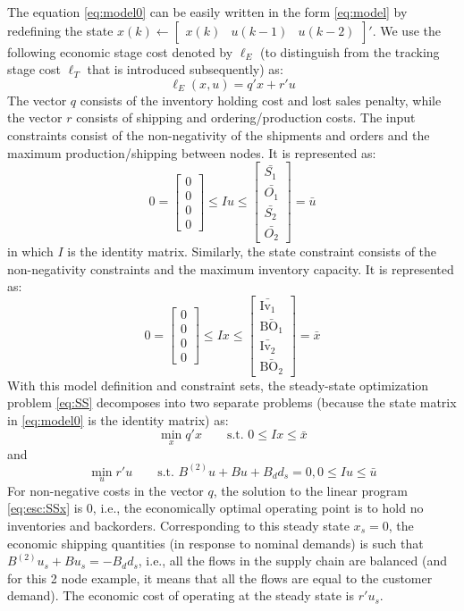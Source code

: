 \documentclass{elsarticle}
\newcommand{\BO}{\textrm{BO}}
\newcommand{\Inv}{\textrm{Iv}}
\theoremstyle{definition}
\begin{document}
The equation \eqref{eq:model0} can be easily written in the form
\eqref{eq:model} by redefining the state $x(k)
\leftarrow \begin{bmatrix}x(k) & u(k-1) & u(k-2) \end{bmatrix}'$.
We use the following economic stage cost denoted by $\ell_E$ (to
distinguish from the tracking stage cost $\ell_T$ that is introduced
subsequently) as:
\[ \ell_E(x,u)  = q'x + r'u\]
The vector $q$ consists of the inventory holding cost and lost sales
penalty, while the vector $r$ consists of shipping and ordering/production
costs.   
The input constraints consist of the non-negativity of the shipments
and orders and the maximum production/shipping between nodes. It is
represented as: 
\[ {0} = \begin{bmatrix}0\\0\\0\\0\end{bmatrix} \leq Iu \leq
  \begin{bmatrix} \bar{S_1} \\ \bar{O_1} \\ \bar{S_2}
    \\ \bar{O_2} \end{bmatrix} = \bar{u} \]
in which $I$ is the identity matrix.
Similarly, the state constraint consists of the non-negativity
constraints and the maximum inventory capacity. It is represented as:
\[ {0} = \begin{bmatrix}0\\0\\0\\0\end{bmatrix} \leq Ix \leq
  \begin{bmatrix} \bar{\Inv_1} \\ \bar{\BO_1} \\ \bar{\Inv_2}
    \\ \bar{\BO_2} \end{bmatrix} = \bar{x} \]
With this model definition and constraint sets, the steady-state
optimization problem \eqref{eq:SS} decomposes into two separate
problems (because the state matrix in \eqref{eq:model0} is the
identity matrix) as:
\begin{equation}
\label{eq:esc:SSx} \min_{x}{q'x} \qquad \text{s.t.~} {0} \leq Ix
\leq \bar{x}
\end{equation}
and
\begin{equation}
\label{eq:esc:SSu} \min_{u}{r'u} \qquad \text{s.t.~}  B^{(2)}u +
Bu + B_dd_s = 0,
 {0} \leq Iu\leq \bar{u}
\end{equation}
For non-negative costs in the vector $q$, the solution to the linear
program \eqref{eq:esc:SSx} is ${0}$, i.e., the economically
optimal operating point is to hold no inventories and
backorders. Corresponding to this steady state $x_s = {0}$,
the economic shipping quantities (in response to nominal demands) is
such that $B^{(2)}u_s + Bu_s = -B_dd_s$, i.e., all the flows in the supply
  chain are balanced (and for this 2 node example, it means that all
  the flows are equal to the customer demand). The economic cost of
  operating at the steady state is $r'u_s$.
\end{document}
